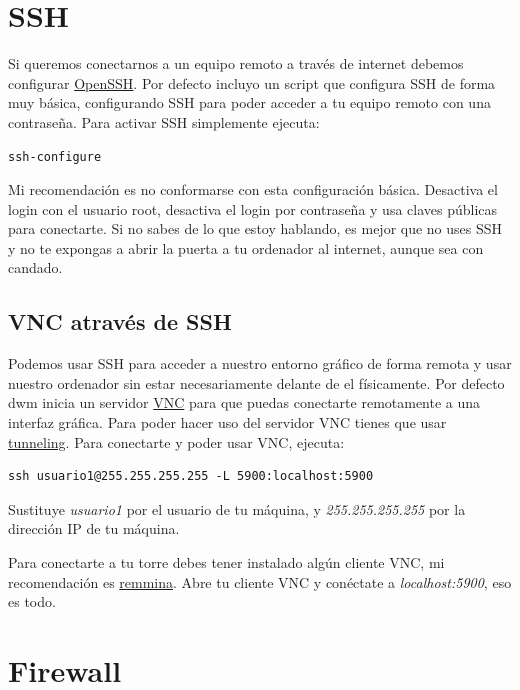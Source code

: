 \documentclass[12pt]{article}
\begin{document}
\section{SSH}

Si queremos conectarnos a un equipo remoto a través de internet debemos configurar \href{https://es.wikipedia.org/wiki/OpenSSH}{OpenSSH}. Por defecto incluyo un script que configura SSH de forma muy básica, configurando SSH para poder acceder a tu equipo remoto con una contraseña. Para activar SSH simplemente ejecuta:

\begin{verbatim}
ssh-configure
\end{verbatim}

Mi recomendación es no conformarse con esta configuración básica. Desactiva el login con el usuario root, desactiva el login por contraseña y usa claves públicas para conectarte. Si no sabes de lo que estoy hablando, es mejor que no uses SSH y no te expongas a abrir la puerta a tu ordenador al internet, aunque sea con candado.

\subsection{VNC através de SSH}

Podemos usar SSH para acceder a nuestro entorno gráfico de forma remota y usar nuestro ordenador sin estar necesariamente delante de el físicamente. Por defecto dwm inicia un servidor \href{https://en.wikipedia.org/wiki/Virtual_Network_Computing}{VNC} para que puedas conectarte remotamente a una interfaz gráfica. Para poder hacer uso del servidor VNC tienes que usar \href{https://en.wikipedia.org/wiki/Tunneling_protocol}{tunneling}. Para conectarte y poder usar VNC, ejecuta:

\begin{verbatim}
ssh usuario1@255.255.255.255 -L 5900:localhost:5900
\end{verbatim}

Sustituye \emph{usuario1} por el usuario de tu máquina, y \emph{255.255.255.255} por la dirección IP de tu máquina.

Para conectarte a tu torre debes tener instalado algún cliente VNC, mi recomendación es \href{https://github.com/FreeRDP/Remmina}{remmina}. Abre tu cliente VNC y conéctate a \emph{localhost:5900}, eso es todo.

\section{Firewall}
\end{document}
